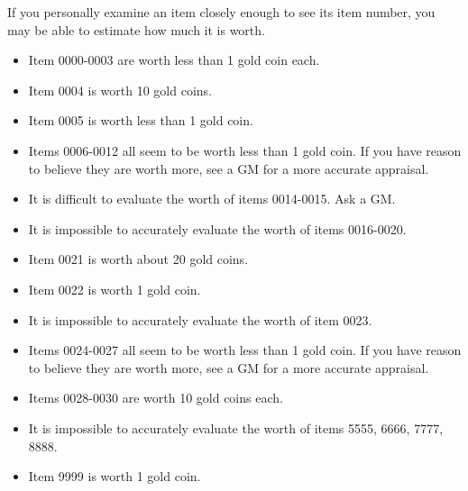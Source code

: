 \documentclass[green]{Kos}
\begin{document}
\name{\gAppraise{}}

If you personally examine an item closely enough to see its item number, you may be able to estimate how much it is worth.

\begin{itemize}
\item Item 0000-0003 are worth less than 1 gold coin each.
\item Item 0004 is worth 10 gold coins.
\item Item 0005 is worth less than 1 gold coin.
\item Items 0006-0012 all seem to be worth less than 1 gold coin. If you have reason to believe they are worth more, see a GM for a more accurate appraisal.
\item It is difficult to evaluate the worth of items 0014-0015. Ask a GM.
\item It is impossible to accurately evaluate the worth of items 0016-0020.
\item Item 0021 is worth about 20 gold coins.
\item Item 0022 is worth 1 gold coin.
\item It is impossible to accurately evaluate the worth of item 0023.
\item Items 0024-0027 all seem to be worth less than 1 gold coin. If you have reason to believe they are worth more, see a GM for a more accurate appraisal.
\item Items 0028-0030 are worth 10 gold coins each.
\item It is impossible to accurately evaluate the worth of items 5555, 6666, 7777, 8888.
\item Item 9999 is worth 1 gold coin.
\end{itemize}
\end{document}
